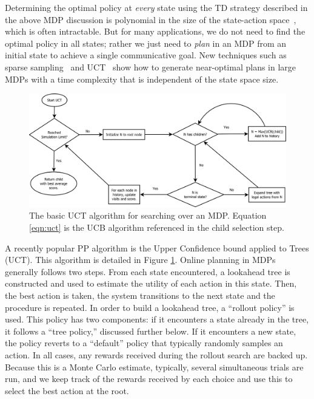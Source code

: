 Determining the optimal policy at {\em every} state using the TD
strategy described in the above MDP discussion is polynomial in the size of the state-action
space~\cite{brafman_2003_rmax}, which is often intractable.
But for many applications, we do not
need to find the optimal policy in all states; rather we just need to {\em plan} in
an MDP from an initial state to achieve a single communicative goal. New techniques such
as sparse sampling~\cite{kearns_1999_sparse} and
UCT~\cite{kocsis_bandit_2006} show how to generate near-optimal plans
in large MDPs with a time complexity that is independent of the state
space size.

\begin{figure}
\centering
\includegraphics[width=\linewidth]{uct.png}
\caption{The basic UCT algorithm for searching over an MDP. Equation \ref{eqn:uct} is
the UCB algorithm referenced in the child selection step.}
\label{uct-diagram}
\end{figure}

A recently popular PP algorithm is the Upper Confidence bound applied to Trees (UCT)\cite{kocsis_bandit_2006}.
This algorithm is detailed in Figure \ref{uct-diagram}.
Online planning in MDPs generally follows two steps. From each state
encountered, a lookahead tree is constructed and used to estimate the
utility of each action in this state. Then, the best action is taken,
the system transitions to the next state and the procedure is
repeated. In order to build a lookahead tree, a ``rollout policy'' is
used. This policy has two components: if it encounters a state already
in the tree, it follows a ``tree policy,'' discussed further below. If
it encounters a new state, the policy reverts to a ``default'' policy
that typically randomly samples an action. In all cases, any rewards
received during the rollout search are backed up. Because this is a
Monte Carlo estimate, typically, several simultaneous trials are run,
and we keep track of the rewards received by each choice and
use this to select the best action at the root.

